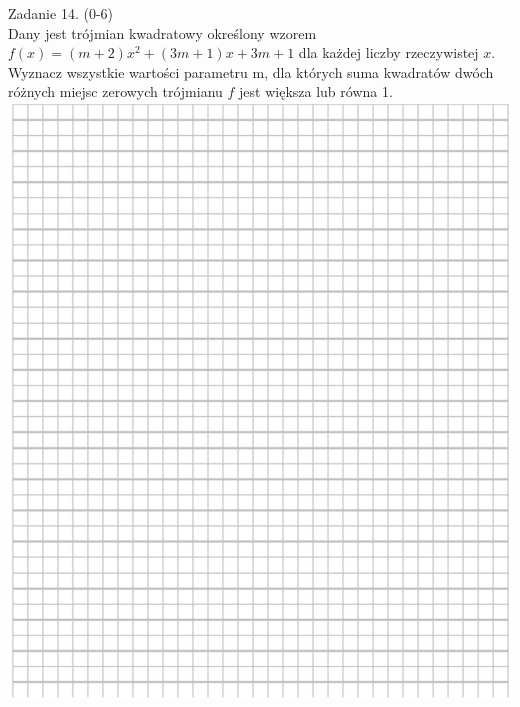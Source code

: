 \documentclass[10pt]{article}
\begin{document}
Zadanie 14. (0-6)\\
Dany jest trójmian kwadratowy określony wzorem \(f(x)=(m+2) x^{2}+(3 m+1) x+3 m+1\) dla każdej liczby rzeczywistej \(x\). Wyznacz wszystkie wartości parametru m, dla których suma kwadratów dwóch różnych miejsc zerowych trójmianu \(f\) jest większa lub równa 1.\\
\includegraphics[max width=\textwidth, center]{2024_11_21_49bfa1d51da2e7fce9c5g-13}\\
\end{document}
